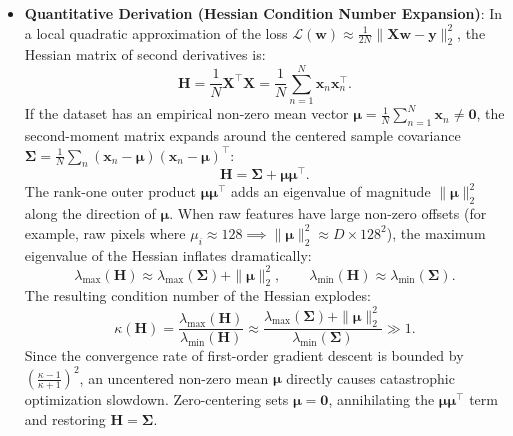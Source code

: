 \begin{itemize}[leftmargin=*]
  \item \textbf{Quantitative Derivation (Hessian Condition Number Expansion)}: In a local quadratic approximation of the loss $\mathcal{L}(\mathbf{w}) \approx \frac{1}{2N} \|\mathbf{X} \mathbf{w} - \mathbf{y}\|_2^2$, the Hessian matrix of second derivatives is:
    \begin{equation}
    \mathbf{H} = \frac{1}{N} \mathbf{X}^\top \mathbf{X} = \frac{1}{N} \sum_{n=1}^N \mathbf{x}_n \mathbf{x}_n^\top.
    \end{equation}
    If the dataset has an empirical non-zero mean vector $\boldsymbol{\mu} = \frac{1}{N}\sum_{n=1}^N \mathbf{x}_n \ne \mathbf{0}$, the second-moment matrix expands around the centered sample covariance $\boldsymbol{\Sigma} = \frac{1}{N} \sum_n (\mathbf{x}_n - \boldsymbol{\mu})(\mathbf{x}_n - \boldsymbol{\mu})^\top$:
    \begin{equation}
    \mathbf{H} = \boldsymbol{\Sigma} + \boldsymbol{\mu} \boldsymbol{\mu}^\top.
    \label{eq:hessian_mean_rank_one}
    \end{equation}
    The rank-one outer product $\boldsymbol{\mu} \boldsymbol{\mu}^\top$ adds an eigenvalue of magnitude $\|\boldsymbol{\mu}\|_2^2$ along the direction of $\boldsymbol{\mu}$. When raw features have large non-zero offsets (for example, raw pixels where $\mu_i \approx 128 \implies \|\boldsymbol{\mu}\|_2^2 \approx D \times 128^2$), the maximum eigenvalue of the Hessian inflates dramatically:
    \begin{equation}
    \lambda_{\max}(\mathbf{H}) \approx \lambda_{\max}(\boldsymbol{\Sigma}) + \|\boldsymbol{\mu}\|_2^2, \qquad \lambda_{\min}(\mathbf{H}) \approx \lambda_{\min}(\boldsymbol{\Sigma}).
    \end{equation}
    The resulting condition number of the Hessian explodes:
    \begin{equation}
    \kappa(\mathbf{H}) = \frac{\lambda_{\max}(\mathbf{H})}{\lambda_{\min}(\mathbf{H})} \approx \frac{\lambda_{\max}(\boldsymbol{\Sigma}) + \|\boldsymbol{\mu}\|_2^2}{\lambda_{\min}(\boldsymbol{\Sigma})} \gg 1.
    \label{eq:condition_number_uncentered}
    \end{equation}
    Since the convergence rate of first-order gradient descent is bounded by $\left( \frac{\kappa - 1}{\kappa + 1} \right)^2$, an uncentered non-zero mean $\boldsymbol{\mu}$ directly causes catastrophic optimization slowdown. Zero-centering sets $\boldsymbol{\mu} = \mathbf{0}$, annihilating the $\boldsymbol{\mu}\boldsymbol{\mu}^\top$ term and restoring $\mathbf{H} = \boldsymbol{\Sigma}$.
\end{itemize}

